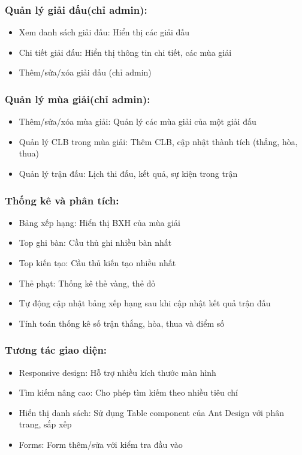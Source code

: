 \documentclass[../BTL.tex]{subfiles}
\begin{document}
\subsubsection{ Quản lý giải đấu(chỉ admin):}
\begin{itemize}
    \item Xem danh sách giải đấu: Hiển thị các giải đấu
    \item Chi tiết giải đấu: Hiển thị thông tin chi tiết, các mùa giải
    \item Thêm/sửa/xóa giải đấu (chỉ admin)
\end{itemize}
\subsubsection{Quản lý mùa giải(chỉ admin):}
\begin{itemize}
    \item Thêm/sửa/xóa mùa giải: Quản lý các mùa giải của một giải đấu
    \item Quản lý CLB trong mùa giải: Thêm CLB, cập nhật thành tích (thắng, hòa, thua)
    \item Quản lý trận đấu: Lịch thi đấu, kết quả, sự kiện trong trận
\end{itemize}
\subsubsection{Thống kê và phân tích:}
\begin{itemize}
    \item Bảng xếp hạng: Hiển thị BXH của mùa giải
    \item Top ghi bàn: Cầu thủ ghi nhiều bàn nhất
    \item Top kiến tạo: Cầu thủ kiến tạo nhiều nhất
    \item Thẻ phạt: Thống kê thẻ vàng, thẻ đỏ
    \item Tự động cập nhật bảng xếp hạng sau khi cập nhật kết quả trận đấu
    \item Tính toán thống kê số trận thắng, hòa, thua và điểm số
\end{itemize}
\subsubsection{Tương tác giao diện:}
\begin{itemize}
    \item Responsive design: Hỗ trợ nhiều kích thước màn hình
    \item Tìm kiếm nâng cao: Cho phép tìm kiếm theo nhiều tiêu chí
    \item Hiển thị danh sách: Sử dụng Table component của Ant Design với phân trang, sắp xếp
    \item Forms: Form thêm/sửa với kiểm tra đầu vào
\end{itemize}
\end{document}
